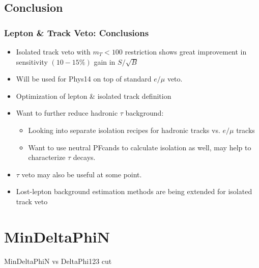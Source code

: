\documentclass{beamer}
\begin{document}
\subsection{Conclusion}
\begin{frame}
  \frametitle{Lepton \& Track Veto: Conclusions}
  \begin{itemize}
  \item Isolated track veto with $m_T<100$ restriction shows great
    improvement in sensitivity $(10-15\%)$ gain in
    $S/\sqrt{B}$
    \item Will be used for Phys14 on top of standard
    $e/\mu$ veto.
    \item Optimization of lepton \& isolated track definition
  \item Want to further reduce hadronic $\tau$ background:
    \begin{itemize}
    \item Looking into separate isolation recipes for hadronic tracks vs. $e/\mu$
      tracks
    \item Want to use neutral PFcands to calculate isolation as well, may
      help to characterize $\tau$ decays.
    \end{itemize}
  \item $\tau$ veto may also be useful at some point.
  \item Lost-lepton background estimation methods are being extended for isolated track veto
  \end{itemize}
\end{frame}










\section{MinDeltaPhiN}
\begin{frame}
  \begin{center}
    {\Large MinDeltaPhiN vs DeltaPhi123 cut}
  \end{center}
\end{frame}
\end{document}
